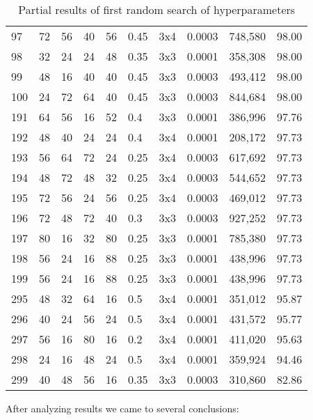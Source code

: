 \begin{table}
\begin{tabular}{llllllllrl}
       97 & 72 & 56 & 40 & 56 & 0.45 & 3x4 & 0.0003 &   748,580 & 98.00\\
       98 & 32 & 24 & 24 & 48 & 0.35 & 3x3 & 0.0001 &   358,308 & 98.00\\
       99 & 48 & 16 & 40 & 40 & 0.45 & 3x3 & 0.0003 &   493,412 & 98.00\\
      100 & 24 & 72 & 64 & 40 & 0.45 & 3x3 & 0.0003 &   844,684 & 98.00\\\midrule
      191 & 64 & 56 & 16 & 52 & 0.4  & 3x3 & 0.0001 &   386,996 & 97.76\\
      192 & 48 & 40 & 24 & 24 & 0.4  & 3x4 & 0.0001 &   208,172 & 97.73\\
      193 & 56 & 64 & 72 & 24 & 0.25 & 3x4 & 0.0003 &   617,692 & 97.73\\
      194 & 48 & 72 & 48 & 32 & 0.25 & 3x4 & 0.0003 &   544,652 & 97.73\\
      195 & 72 & 56 & 24 & 56 & 0.25 & 3x4 & 0.0003 &   469,012 & 97.73\\
      196 & 72 & 48 & 72 & 40 & 0.3  & 3x3 & 0.0003 &   927,252 & 97.73\\
      197 & 80 & 16 & 32 & 80 & 0.25 & 3x3 & 0.0001 &   785,380 & 97.73\\
      198 & 56 & 24 & 16 & 88 & 0.25 & 3x3 & 0.0001 &   438,996 & 97.73\\
      199 & 56 & 24 & 16 & 88 & 0.25 & 3x3 & 0.0001 &   438,996 & 97.73\\\midrule
      295 & 48 & 32 & 64 & 16 & 0.5  & 3x4 & 0.0001 &   351,012 & 95.87\\
      296 & 40 & 24 & 56 & 24 & 0.5  & 3x4 & 0.0001 &   431,572 & 95.77\\
      297 & 56 & 16 & 80 & 16 & 0.2  & 3x4 & 0.0001 &   411,020 & 95.63\\
      298 & 24 & 16 & 48 & 24 & 0.5  & 3x4 & 0.0001 &   359,924 & 94.46\\
      299 & 40 & 48 & 56 & 16 & 0.35 & 3x3 & 0.0003 &   310,860 & 82.86\\\bottomrule
    \end{tabular}
    \caption{ Partial results of first random search of hyperparameters}
    \label{hyper_results1}
\end{table}

After analyzing results we came to several conclusions:

